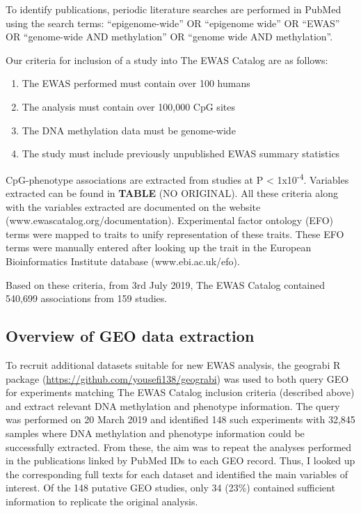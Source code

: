 \documentclass[11pt,twoside]{bristolthesis}
\providecommand{\tightlist}{%
  \setlength{\itemsep}{0pt}\setlength{\parskip}{0pt}}
\begin{document}
To identify publications, periodic literature searches are performed in PubMed using the search terms: ``epigenome-wide'' OR ``epigenome wide'' OR ``EWAS'' OR ``genome-wide AND methylation'' OR ``genome wide AND methylation''.

Our criteria for inclusion of a study into The EWAS Catalog are as follows:
\begin{enumerate}
\def\labelenumi{\arabic{enumi}.}
\tightlist
\item
  The EWAS performed must contain over 100 humans
\item
  The analysis must contain over 100,000 CpG sites
\item
  The DNA methylation data must be genome-wide
\item
  The study must include previously unpublished EWAS summary statistics
\end{enumerate}
CpG-phenotype associations are extracted from studies at P \textless{} 1x10\textsuperscript{-4}. Variables extracted can be found in \textbf{TABLE} (NO ORIGINAL). All these criteria along with the variables extracted are documented on the website (www.ewascatalog.org/documentation). Experimental factor ontology (EFO) terms were mapped to traits to unify representation of these traits. These EFO terms were manually entered after looking up the trait in the European Bioinformatics Institute database (www.ebi.ac.uk/efo).

Based on these criteria, from 3rd July 2019, The EWAS Catalog contained 540,699 associations from 159 studies.

\hypertarget{overview-of-geo-data-extraction}{%
\subsection{Overview of GEO data extraction}\label{overview-of-geo-data-extraction}}

To recruit additional datasets suitable for new EWAS analysis, the geograbi R package (\url{https://github.com/yousefi138/geograbi}) was used to both query GEO for experiments matching The EWAS Catalog inclusion criteria (described above) and extract relevant DNA methylation and phenotype information. The query was performed on 20 March 2019 and identified 148 such experiments with 32,845 samples where DNA methylation and phenotype information could be successfully extracted. From these, the aim was to repeat the analyses performed in the publications linked by PubMed IDs to each GEO record. Thus, I looked up the corresponding full texts for each dataset and identified the main variables of interest. Of the 148 putative GEO studies, only 34 (23\%) contained sufficient information to replicate the original analysis.
\end{document}
